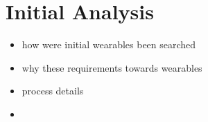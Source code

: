\chapter{Initial Analysis}\label{cha:initialAnalysis}
\begin{itemize}
	\item how were initial wearables been searched
	\item why these requirements towards wearables
	\item process details
	\item 
	
	
	
	
	
	
	
	
	
\end{itemize}